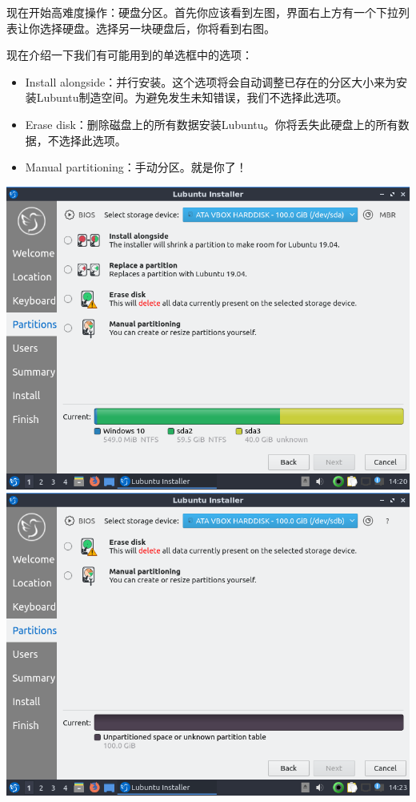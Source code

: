 \documentclass{book}
\begin{document}
现在开始高难度操作：硬盘分区。首先你应该看到左图，界面右上方有一个下拉列表让你选择硬盘。选择另一块硬盘后，你将看到右图。\par
现在介绍一下我们有可能用到的单选框中的选项：
\begin{itemize}
	\item Install alongside：并行安装。这个选项将会自动调整已存在的分区大小来为安装Lubuntu制造空间。为避免发生未知错误，我们不选择此选项。
	\item Erase disk：删除磁盘上的所有数据安装Lubuntu。你将丢失此硬盘上的所有数据，不选择此选项。
	\item Manual partitioning：手动分区。就是你了！
\end{itemize}
\begin{center}
	\includegraphics[scale=0.4]{pic/lubinst6}	\includegraphics[scale=0.4]{pic/lubinst7}
\end{center}
\end{document}
